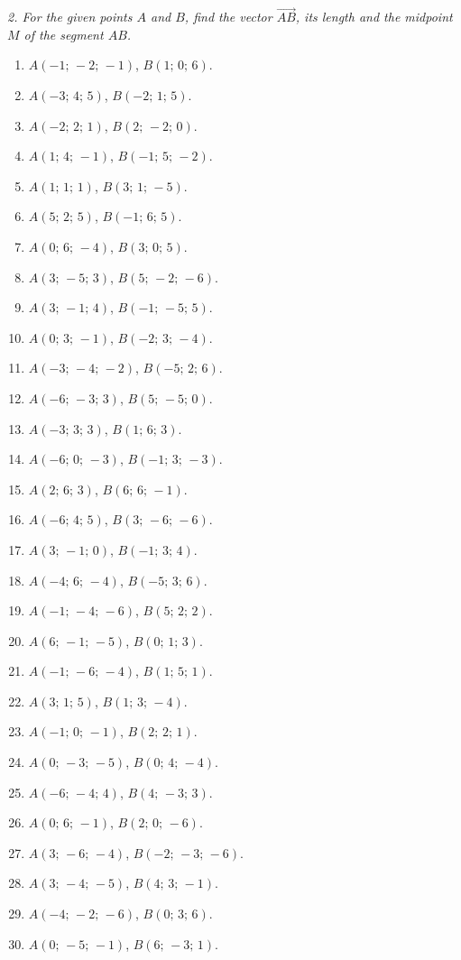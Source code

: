 \emph{2. For the given points $A$ and $B$, find the vector $\overrightarrow{AB}$, its length and the midpoint $M$ of the segment $AB$.}
\bigskip
\begin{enumerate}[label=\arabic*., leftmargin=*]
\item $A(-1;\,-2;\,-1)$, $B(1;\,0;\,6)$.
\item $A(-3;\,4;\,5)$, $B(-2;\,1;\,5)$.
\item $A(-2;\,2;\,1)$, $B(2;\,-2;\,0)$.
\item $A(1;\,4;\,-1)$, $B(-1;\,5;\,-2)$.
\item $A(1;\,1;\,1)$, $B(3;\,1;\,-5)$.
\item $A(5;\,2;\,5)$, $B(-1;\,6;\,5)$.
\item $A(0;\,6;\,-4)$, $B(3;\,0;\,5)$.
\item $A(3;\,-5;\,3)$, $B(5;\,-2;\,-6)$.
\item $A(3;\,-1;\,4)$, $B(-1;\,-5;\,5)$.
\item $A(0;\,3;\,-1)$, $B(-2;\,3;\,-4)$.
\item $A(-3;\,-4;\,-2)$, $B(-5;\,2;\,6)$.
\item $A(-6;\,-3;\,3)$, $B(5;\,-5;\,0)$.
\item $A(-3;\,3;\,3)$, $B(1;\,6;\,3)$.
\item $A(-6;\,0;\,-3)$, $B(-1;\,3;\,-3)$.
\item $A(2;\,6;\,3)$, $B(6;\,6;\,-1)$.
\item $A(-6;\,4;\,5)$, $B(3;\,-6;\,-6)$.
\item $A(3;\,-1;\,0)$, $B(-1;\,3;\,4)$.
\item $A(-4;\,6;\,-4)$, $B(-5;\,3;\,6)$.
\item $A(-1;\,-4;\,-6)$, $B(5;\,2;\,2)$.
\item $A(6;\,-1;\,-5)$, $B(0;\,1;\,3)$.
\item $A(-1;\,-6;\,-4)$, $B(1;\,5;\,1)$.
\item $A(3;\,1;\,5)$, $B(1;\,3;\,-4)$.
\item $A(-1;\,0;\,-1)$, $B(2;\,2;\,1)$.
\item $A(0;\,-3;\,-5)$, $B(0;\,4;\,-4)$.
\item $A(-6;\,-4;\,4)$, $B(4;\,-3;\,3)$.
\item $A(0;\,6;\,-1)$, $B(2;\,0;\,-6)$.
\item $A(3;\,-6;\,-4)$, $B(-2;\,-3;\,-6)$.
\item $A(3;\,-4;\,-5)$, $B(4;\,3;\,-1)$.
\item $A(-4;\,-2;\,-6)$, $B(0;\,3;\,6)$.
\item $A(0;\,-5;\,-1)$, $B(6;\,-3;\,1)$.
\end{enumerate}

